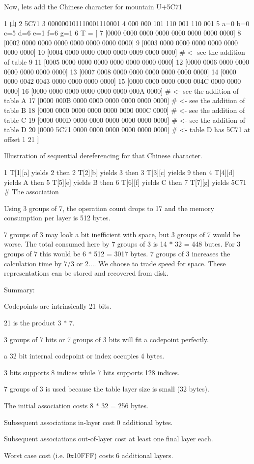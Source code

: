 Now, let\textquotesingle{}s add the Chinese character for mountain U+5\+C71 
\begin{DoxyCode}
1 山
2 5C71
3 000000101110001110001 
4 000 000 101 110 001 110 001
5 a=0 b=0 c=5 d=6 e=1 f=6 g=1
6 T = [
7  [0000 0000 0000 0000 0000 0000 0000 0000]
8  [0002 0000 0000 0000 0000 0000 0000 0000]
9  [0003 0000 0000 0000 0000 0000 0000 0000]
10  [0004 0000 0000 0000 0000 0009 0000 0000] # <- see the addition of table 9
11  [0005 0000 0000 0000 0000 0000 0000 0000]
12  [0000 0006 0000 0000 0000 0000 0000 0000]
13  [0007 0008 0000 0000 0000 0000 0000 0000]
14  [0000 0000 0042 0043 0000 0000 0000 0000]
15  [0000 0000 0000 0000 004C 0000 0000 0000]
16  [0000 0000 0000 0000 0000 0000 000A 0000] # <- see the addition of table A
17  [0000 000B 0000 0000 0000 0000 0000 0000] # <- see the addition of table B
18  [0000 0000 0000 0000 0000 0000 000C 0000] # <- see the addition of table C
19  [0000 000D 0000 0000 0000 0000 0000 0000] # <- see the addition of table D
20  [0000 5C71 0000 0000 0000 0000 0000 0000] # <- table D has 5C71 at offset 1
21 ]
\end{DoxyCode}


Illustration of sequential dereferencing for that Chinese character. 
\begin{DoxyCode}
1 T[1][a] yields 2 then
2 T[2][b] yields 3 then
3 T[3][c] yields 9 then
4 T[4][d] yields A then
5 T[5][e] yields B then
6 T[6][f] yields C then
7 T[7][g] yields 5C71  # The association
\end{DoxyCode}


Using 3 groups of 7, the operation count drops to 17 and the memory consumption per layer is 512 bytes.

7 groups of 3 may look a bit inefficient with space, but 3 groups of 7 would be worse. The total consumed here by 7 groups of 3 is 14 $\ast$ 32 = 448 butes. For 3 groups of 7 this would be 6 $\ast$ 512 = 3017 bytes. 7 groups of 3 increases the calculation time by 7/3 or 2.... We choose to trade speed for space. These representations can be stored and recovered from disk.

Summary\+:
\begin{DoxyItemize}
\item Codepoints are intrinsically 21 bits.
\item 21 is the product 3 $\ast$ 7.
\item 3 groups of 7 bits or 7 groups of 3 bits will fit a codepoint perfectly.
\item a 32 bit internal codepoint or index occupies 4 bytes.
\item 3 bits supports 8 indices while 7 bits supports 128 indices.
\item 7 groups of 3 is used because the table layer size is small (32 bytes).
\item The initial association costs 8 $\ast$ 32 = 256 bytes.
\item Subsequent associations in-\/layer cost 0 additional bytes.
\item Subsequent associations out-\/of-\/layer cost at least one final layer each.
\item Worst case cost (i.\+e. 0x10\+F\+F\+F) costs 6 additional layers.
\end{DoxyItemize}

